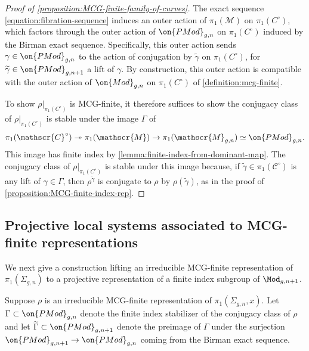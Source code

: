 \subsubsection{}
\label{subsubsection:proof-family-of-curves}
\begin{proof}[Proof of {\autoref{proposition:MCG-finite-family-of-curves}}]
	The exact sequence \eqref{equation:fibration-sequence}
induces an outer action of $\pi_1(\mathscr M)$ on
$\pi_1(C^\circ)$, which factors through the outer action of $\on{PMod}_{g,n}$ on
$\pi_1(C^\circ)$ induced by the Birman exact sequence.
Specifically, this outer action sends $\gamma \in \on{PMod}_{g,n}$
to the action of conjugation by $\widetilde{\gamma}$ on $\pi_1(C^\circ)$, for
$\widetilde{\gamma}\in \on{PMod}_{g,n+1}$
a lift of $\gamma$.
By construction, this outer action is compatible with the outer action of $\on{Mod}_{g,n}$ on
$\pi_1(C^\circ)$ of \autoref{definition:mcg-finite}.

To show $\rho|_{\pi_1(C^\circ)}$ is MCG-finite,
it therefore suffices to show the conjugacy class of $\rho|_{\pi_1(C^\circ)}$ is stable under
the image $\Gamma$ of $$\pi_1(\mathscr{C}^\circ)\twoheadrightarrow \pi_1(\mathscr{M})\to \pi_1(\mathscr{M}_{g,n})\simeq \on{PMod}_{g,n}.$$
This image has finite index by \autoref{lemma:finite-index-from-dominant-map}.
The conjugacy class of $\rho|_{\pi_1(C^\circ)}$ is stable under this image because,
if $\widetilde{\gamma} \in \pi_1(\mathscr{C}^\circ)$ is any lift of
$\gamma \in \Gamma$, then $\rho^{\widetilde{\gamma}}$ is conjugate to $\rho$ by $\rho(\widetilde{\gamma})$, as in the proof of \autoref{proposition:MCG-finite-index-rep}.
\end{proof}
\subsection{Projective local systems associated to MCG-finite representations}
\label{subsection:mcg-finite-construction}

We next give a construction lifting an irreducible MCG-finite representation
of $\pi_1(\Sigma_{g,n})$ to a projective representation of a finite index subgroup of $\Mod_{g,n+1}$.

\begin{notation}
\notready
	\label{notation:finite-orbit}
	Suppose $\rho$ is an irreducible MCG-finite representation of $\pi_1(\Sigma_{g,n},x)$.
	Let $\Gamma \subset \on{PMod}_{g,n}$ denote the finite index stabilizer
	of the conjugacy class of $\rho$ and let $\widetilde{\Gamma} \subset
	\on{PMod}_{g,n+1}$ denote the preimage of $\Gamma$ under the surjection
	$\on{PMod}_{g,n+1} \to \on{PMod}_{g,n}$ coming from the Birman exact
	sequence.
\end{notation}

